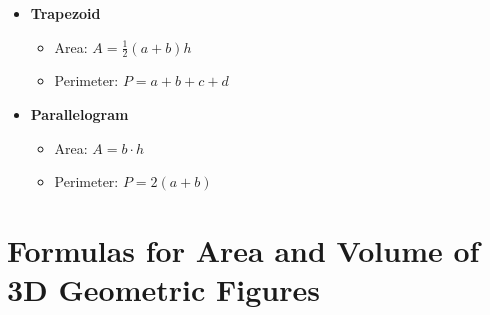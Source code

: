 \begin{itemize}
	\item \textbf{Trapezoid}
	      \begin{itemize}
		      \item Area: \(A = \frac{1}{2}(a + b)h\)
		      \item Perimeter: \(P = a + b + c + d\)
	      \end{itemize}

	\item \textbf{Parallelogram}
	      \begin{itemize}
		      \item Area: \(A = b \cdot h\)
		      \item Perimeter: \(P = 2(a + b)\)
	      \end{itemize}

\end{itemize}

\section{Formulas for Area and Volume of 3D Geometric Figures}

